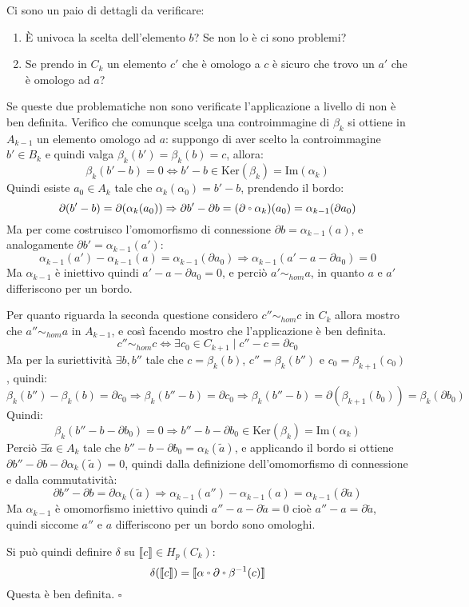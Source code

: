 \documentclass[10pt, twoside=false, x11names]{scrbook}
\newenvironment{proof}{{\textbf{Dimostrazione}:}}{\hfill $\square$}
\newcommand{\im}[1]{\mathrm{Im}( #1 )}
\renewcommand{\ker}[1]{\mathrm{Ker}( #1)}
\let\latexcirc=\circ
\newcommand{\ccirc}{\mathbin{\mathchoice
  {\xcirc\scriptstyle}
  {\xcirc\scriptstyle}
  {\xcirc\scriptscriptstyle}
  {\xcirc\scriptscriptstyle}
}}
\newcommand{\xcirc}[1]{\vcenter{\hbox{$#1\latexcirc$}}}
\let\circ\ccirc
\begin{document}
\begin{proof}
  Ci sono un paio di dettagli da verificare:
  \begin{enumerate}
  \item È univoca la scelta dell'elemento $ b $? Se non lo è ci sono
    problemi?
  \item Se prendo in $ C_k $ un elemento $ c' $ che è omologo
    a $ c $ è sicuro che trovo un $ a' $ che è
    omologo ad $ a $?
  \end{enumerate}
  Se queste due problematiche non sono verificate l'applicazione a livello di
  non è ben definita.
  Verifico che comunque scelga una controimmagine di $ \beta_k $ si ottiene
  in $ A_{k-1} $ un elemento omologo ad $ a $:
  suppongo di aver scelto la controimmagine $ b' \in B_k $ e quindi
  valga $ \beta_k (b') = \beta_k (b) = c $, allora:
  \[
    \beta_k(b' - b) = 0 \iff b' - b \in \ker{\beta_k} = \im{\alpha_k}
  \]
  Quindi esiste $ a_0 \in A_k $ tale che $ \alpha_k(\alpha_0) = b' - b $, prendendo
  il bordo:
  \[
    \partial ( b' - b ) = \partial ( \alpha_k (a_0 )) \Rightarrow \partial b' - \partial b = (\partial \circ \alpha_k)(a_0) = \alpha_{k-1}(\partial a_0)
  \]
  Ma per come costruisco l'omomorfismo di connessione $ \partial b = \alpha_{k-1}(a) $,
  e analogamente $ \partial b' = \alpha_{k-1}(a') $:
  \[
    \alpha_{k-1}(a') - \alpha_{k-1}(a) = \alpha_{k-1}(\partial a_0) \Rightarrow \alpha_{k-1}(a' - a - \partial a_0) = 0
  \]
  Ma $ \alpha_{k-1} $ è iniettivo quindi $ a' - a - \partial a_0 = 0 $, e perciò  $ a' \sim_{hom} a $,
  in quanto $ a $ e $ a' $ differiscono per un bordo.

  Per quanto riguarda la seconda questione considero $ c'' \sim_{hom} c $ in $ C_k $
  allora mostro che $ a'' \sim_{hom} a $ in $ A_{k-1} $, e così facendo
  mostro che l'applicazione è ben definita.
  \[
    c'' \sim_{hom} c \iff \exists c_0 \in C_{k+1} \; | \; c'' - c = \partial c_0
  \]
  Ma per la suriettività $ \exists b, b'' $ tale che $ c = \beta_k(b) $,
  $ c'' = \beta_k(b'') $ e $ c_0 = \beta_{k+1}(c_0) $, quindi:
  \[
    \beta_k(b'') - \beta_k(b) = \partial c_0 \Rightarrow \beta_k(b'' - b) = \partial c_0  \Rightarrow
    \beta_k(b''-b) = \partial\left( \beta_{k+1}(b_0)\right) = \beta_{k}(\partial b_0)
  \]
  Quindi:
  \[
    \beta_k(b'' - b - \partial b_0) = 0 \Rightarrow b'' - b - \partial b_0 \in \ker{\beta_k} = \im{\alpha_k}
  \]
  Perciò $ \exists \tilde{a} \in A_k$ tale che $ b'' - b - \partial b_0 = \alpha_k (\tilde{a}) $, e
  applicando il bordo si ottiene $ \partial b'' - \partial b - \partial \alpha_k(\tilde{a}) = 0 $, quindi
  dalla definizione dell'omomorfismo di connessione e dalla commutatività:
  \[
    \partial b'' - \partial b = \partial \alpha_{k}(\tilde{a}) \Rightarrow \alpha_{k-1}(a'') - \alpha_{k-1}(a) = \alpha_{k-1}(\partial \tilde{a})
  \]
  Ma $ \alpha_{k-1} $ è omomorfismo iniettivo quindi
  $ a'' - a - \partial \tilde{a} = 0 $ cioè $ a'' - a = \partial \tilde{a} $,
  quindi siccome $ a'' $ e $ a $ differiscono per un bordo sono omologhi.

  Si può quindi definire $ \delta $ su $ \llbracket c \rrbracket \in H_p(C_k) $:
  \[
    \delta(\llbracket c \rrbracket) = \llbracket \alpha \circ \partial \circ \beta^{-1}(c) \rrbracket
  \]
  Questa è ben definita.
\end{proof}
\end{document}
